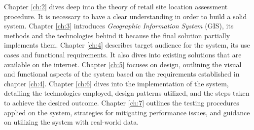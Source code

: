 Chapter \ref{ch:2} dives deep into the theory of retail site location assessment procedure. It is necessary to have a clear understanding in order to build a solid system. Chapter \ref{ch:3} introduces \textit{Geographic Information System} (GIS), its methods and the technologies behind it because the final solution partially implements them. Chapter \ref{ch:4} describes target audience for the system, its use cases and functional requirements. It also dives into existing solutions that are available on the internet. Chapter \ref{ch:5} focuses on design, outlining the visual and functional aspects of the system based on the requirements established in chapter \ref{ch:4}. Chapter \ref{ch:6} dives into the implementation of the system, detailing the technologies employed, design patterns utilized, and the steps taken to achieve the desired outcome. Chapter \ref{ch:7} outlines the testing procedures applied on the system, strategies for mitigating performance issues, and guidance on utilizing the system with real-world data.